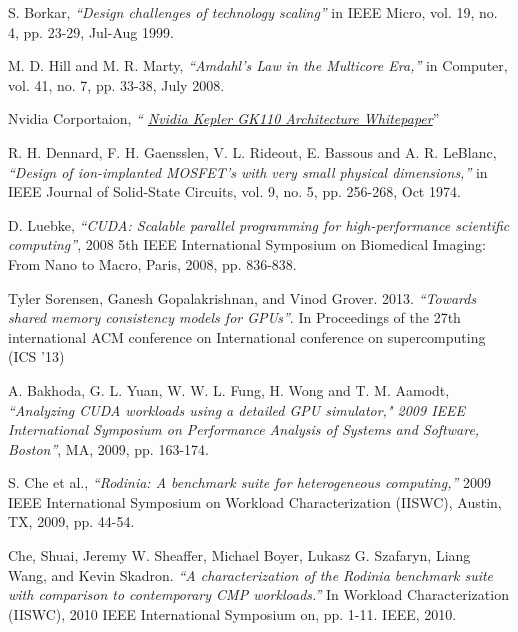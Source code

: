 \documentclass{thesis}
\begin{document}
\PrepareForBiblio
\begin{thebibliography}{1}
\begin{LTRitems}

\setpersianfont{}\resetlatinfont
\newblock S. Borkar, {\itshape``Design challenges of technology scaling''} in
IEEE Micro,
vol.
19,
no. 4, pp. 23-29, Jul-Aug 1999.

\setpersianfont{}\resetlatinfont
\newblock M. D. Hill and M. R. Marty, {\itshape``Amdahl's Law in the Multicore
Era,''} in
Computer,
vol. 41, no. 7, pp. 33-38, July 2008.

\setpersianfont{}\resetlatinfont
\newblock Nvidia Corportaion, {\itshape``
\href{https://www.nvidia.com/content/PDF/kepler/NVIDIA-Kepler
-GK110-Architecture-Whitepaper.pdf}{Nvidia Kepler GK110 Architecture
Whitepaper}}''

\setpersianfont{}\resetlatinfont
\newblock R. H. Dennard, F. H. Gaensslen, V. L. Rideout, E. Bassous and A. R.
LeBlanc, {\itshape``Design of ion-implanted MOSFET's with very small physical
dimensions,''} in IEEE Journal of Solid-State Circuits, vol. 9, no. 5, pp.
256-268, Oct 1974.

\setpersianfont{}\resetlatinfont
\newblock D. Luebke, {\itshape ``CUDA: Scalable parallel programming for
high-performance
scientific
computing''}, 2008 5th IEEE International Symposium on Biomedical Imaging: From
Nano to Macro, Paris, 2008, pp. 836-838.

\setpersianfont{}\resetlatinfont
\newblock Tyler Sorensen, Ganesh Gopalakrishnan, and Vinod Grover. 2013.
{\itshape ``Towards
shared
memory consistency models for GPUs''}. In Proceedings of the 27th international
ACM conference on International conference on supercomputing (ICS '13)

\setpersianfont{}\resetlatinfont
\newblock A. Bakhoda, G. L. Yuan, W. W. L. Fung, H. Wong and T. M. Aamodt,
{\itshape ``Analyzing
CUDA workloads using a detailed GPU simulator," 2009 IEEE International
Symposium on Performance Analysis of Systems and Software, Boston''}, MA, 2009,
pp. 163-174.

\setpersianfont{}\resetlatinfont
\newblock S. Che et al., {\itshape ``Rodinia: A benchmark suite for
heterogeneous
computing,''} 2009
IEEE International Symposium on Workload Characterization (IISWC), Austin, TX,
2009, pp. 44-54.

\setpersianfont{}\resetlatinfont
\newblock Che, Shuai, Jeremy W. Sheaffer, Michael Boyer, Lukasz G. Szafaryn,
Liang Wang, and Kevin Skadron. {\itshape ``A characterization of the Rodinia
benchmark
suite with comparison to contemporary CMP workloads.''} In Workload
Characterization (IISWC), 2010 IEEE International Symposium on, pp. 1-11. IEEE,
2010.


\end{LTRitems}
\end{thebibliography}
\end{document}
